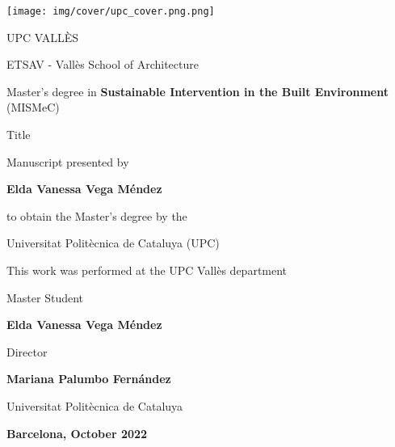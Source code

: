 \begin{titlepage}

\begin{center}
\texttt{[image: img/cover/upc\_cover.png.png]}
  
\vspace*{1ex}
UPC VALLÈS

ETSAV - Vallès School of Architecture

Master's degree in \textbf{Sustainable Intervention in the Built Environment} (MISMeC)

\vspace*{2ex}

{\huge\mdseries Title\par}
\vspace*{2ex}

Manuscript presented by

\textbf{Elda Vanessa Vega Méndez}

to obtain the Master’s degree by the 

Universitat Politècnica de Cataluya (UPC)

\vspace*{3ex}
This work was performed at the UPC Vallès department 

\vfill
\begin{minipage}[b]{1\linewidth}\centering
Master Student
  
\textbf{Elda Vanessa Vega Méndez}
\end{minipage}
\end{center}

\vspace*{5ex}
\begin{minipage}[b]{0.9\linewidth}\centering
Director
  
\textbf{Mariana Palumbo Fernández}

Universitat Politècnica de Cataluya
\end{minipage}

\vspace*{2ex}

\begin{center}
\textbf{Barcelona, October 2022}
\end{center}

\end{titlepage}
